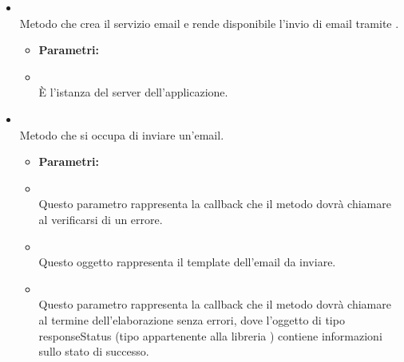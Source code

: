 \begin{itemize}
\item[] \textbf{} \\ Metodo che crea il servizio email e rende disponibile l'invio di email tramite .
\begin{itemize}\addtolength{\itemsep}{-0.5\baselineskip}
\item[] \textbf{Parametri:}
\item[]  \\ È l'istanza del server dell'applicazione.
\end{itemize}
\item[] \textbf{} \\ Metodo che si occupa di inviare un'email.
\begin{itemize}\addtolength{\itemsep}{-0.5\baselineskip}
\item[] \textbf{Parametri:}
\item[]  \\ Questo parametro rappresenta la callback che il metodo dovrà chiamare al verificarsi di un errore.
\item[]  \\ Questo oggetto rappresenta il template dell'email da inviare.
\item[]  \\ Questo parametro rappresenta la callback che il metodo dovrà chiamare al termine dell'elaborazione senza errori, dove l'oggetto di tipo responseStatus (tipo appartenente alla libreria ) contiene informazioni sullo stato di successo.
\end{itemize}
\end{itemize}

